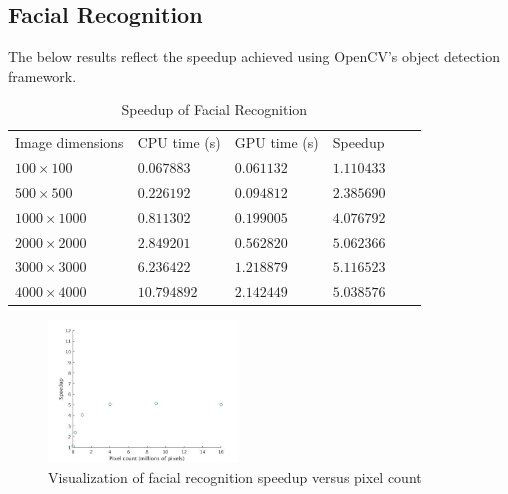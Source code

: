 \documentclass[journal]{IEEEtran}
\begin{document}
\subsection{Facial Recognition}
The below results reflect the speedup achieved using OpenCV's object detection framework.
\begin{table}[H]
	\small
	\centering
	\caption{Speedup of Facial Recognition}
	\label{facial-recognition-speedup}
	\begin{tabular}{llllll}
	 Image dimensions & CPU time (s) & GPU time (s) & Speedup \\
	 $100 \times 100$ & $0.067883$ & $0.061132$ & $1.110433$ \\
	 $500 \times 500$ & $0.226192$ & $0.094812$ & $2.385690$ \\
	 $1000 \times 1000$ & $0.811302$ & $0.199005$ & $4.076792$ \\
	 $2000 \times 2000$ & $2.849201$ & $0.562820$ & $5.062366$ \\
	 $3000 \times 3000$ & $6.236422$ & $1.218879$ & $5.116523$ \\
	 $4000 \times 4000$ & $10.794892$ & $2.142449$ & $5.038576$ \\
	\end{tabular}
\end{table}
\begin{figure}[h]
	\centering
	\includegraphics[width=0.45\textwidth]{facial_recognition_speedup_graph.jpg}
	\caption{Visualization of facial recognition speedup versus pixel count}
    \label{facial-recognition-speedup-graph}
\end{figure}
\end{document}
